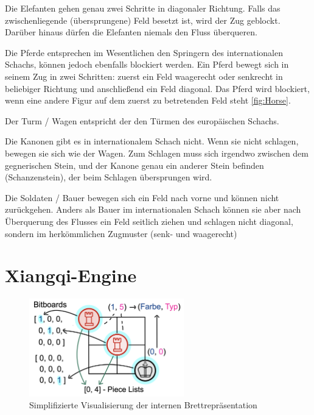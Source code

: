 \documentclass{jpp}
\begin{document}
Die Elefanten gehen genau zwei Schritte in diagonaler Richtung. Falls das zwischenliegende (übersprungene) Feld besetzt ist, wird der Zug geblockt. Darüber hinaus dürfen die Elefanten niemals den Fluss überqueren.

Die Pferde entsprechen im Wesentlichen den Springern des internationalen Schachs, können jedoch ebenfalls blockiert werden. Ein Pferd bewegt sich in seinem Zug in zwei Schritten: zuerst ein Feld waagerecht oder senkrecht in beliebiger Richtung und anschließend ein Feld diagonal. Das Pferd wird blockiert, wenn eine andere Figur auf dem zuerst zu betretenden Feld steht \ref{fig:Horse}.

 Der Turm / Wagen entspricht der den Türmen des europäischen Schachs. 
 
 Die Kanonen gibt es in internationalem Schach nicht. Wenn sie nicht schlagen, bewegen sie sich wie der Wagen. Zum Schlagen muss sich irgendwo zwischen dem gegnerischen Stein, und der Kanone genau ein anderer Stein befinden (Schanzenstein), der beim Schlagen übersprungen wird.
 
 Die Soldaten / Bauer bewegen sich ein Feld nach vorne und können nicht zurückgehen. Anders als Bauer im internationalen Schach können sie aber nach Überquerung des Flusses ein Feld seitlich ziehen und schlagen nicht diagonal, sondern im herkömmlichen Zugmuster (senk- und waagerecht)

\section{Xiangqi-Engine}
\begin{figure}
    \centering
    \includegraphics[width={0.6\textwidth}]{imgs/Board repr.png}
    \caption{Simplifizierte Visualisierung der internen Brettrepräsentation}
    \label{fig:repr}
\end{figure}
\end{document}
